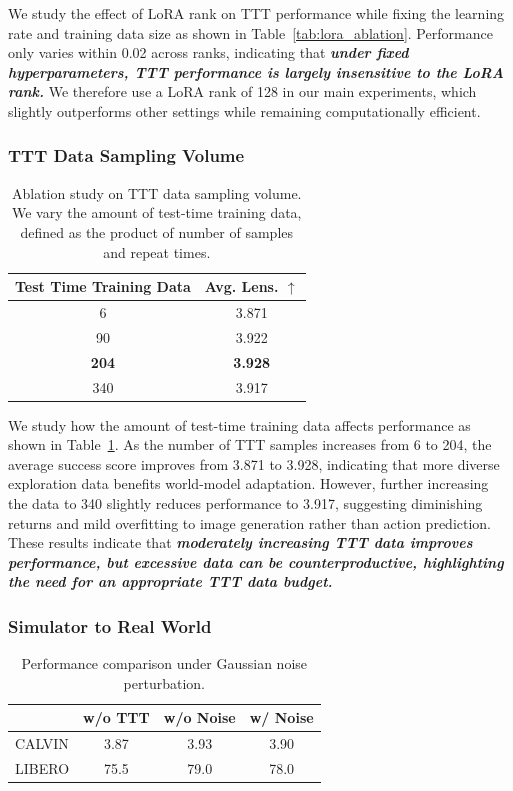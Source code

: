 We study the effect of LoRA rank on TTT performance while fixing the learning rate and training data size as shown in Table~\ref{tab:lora_ablation}. Performance only varies within 0.02 across ranks, indicating that \textbf{\textit{under fixed hyperparameters, TTT performance is largely insensitive to the LoRA rank.}} We therefore use a LoRA rank of 128 in our main experiments, which slightly outperforms other settings while remaining computationally efficient.


\subsubsection{TTT Data Sampling Volume}
\begin{table}[h]
\centering
\begin{tabular}{cc}
\toprule
Test Time Training Data & Avg. Lens. $\uparrow$ \\
\midrule
6 & 3.871 \\
90 & 3.922 \\
\textbf{204} & \textbf{3.928} \\
340 & 3.917 \\
\bottomrule
\end{tabular}
\caption{Ablation study on TTT data sampling volume. We vary the amount of test-time training data, defined as the product of number of samples and repeat times.}
\label{tab:data_volume_ablation}
\end{table}

We study how the amount of test-time training data affects performance as shown in Table~\ref{tab:data_volume_ablation}. As the number of TTT samples increases from 6 to 204, the average success score improves from 3.871 to 3.928, indicating that more diverse exploration data benefits world-model adaptation. However, further increasing the data to 340 slightly reduces performance to 3.917, suggesting diminishing returns and mild overfitting to image generation rather than action prediction. These results indicate that \textbf{\textit{moderately increasing TTT data improves performance, but excessive data can be counterproductive, highlighting the need for an appropriate TTT data budget.}}


\subsubsection{Simulator to Real World}

\begin{table}[h]
\centering


\begin{tabular}{lccc}
\toprule
\textbf{} & w/o TTT & w/o Noise & w/ Noise \\
\midrule
CALVIN & 3.87 & 3.93 & 3.90 \\
LIBERO & 75.5 & 79.0 & 78.0 \\
\bottomrule
\end{tabular} 
\caption{Performance comparison under Gaussian noise perturbation.}
\label{tab:gaussian_noise}
\end{table}

